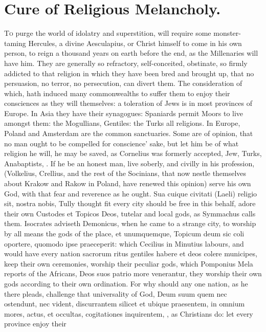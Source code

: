 {%
\section{Cure of Religious Melancholy.}

\lettrine{T}{o} purge the world of idolatry and superstition, will require some
monster-taming Hercules, a divine Aesculapius, or Christ himself to
come in his own person, to reign a thousand years on earth before the
end, as the Millenaries will have him. They are generally so
refractory, self-conceited, obstinate, so firmly addicted to that
religion in which they have been bred and brought up, that no
persuasion, no terror, no persecution, can divert them. The
consideration of which, hath induced many commonwealths to suffer them
to enjoy their consciences as they will themselves: a toleration of
Jews is in most provinces of Europe. In Asia they have their
synagogues: Spaniards permit Moors to live amongst them: the
Mogullians, Gentiles: the Turks all religions. In Europe, Poland and
Amsterdam are the common sanctuaries. Some are of opinion, that no man
ought to be compelled for conscience' sake, but let him be of what
religion he will, he may be saved, as Cornelius was formerly accepted,
Jew, Turks, Anabaptists, \etc{}. If he be an honest man, live soberly, and
civilly in his profession, (Volkelius, Crellius, and the rest of the
Socinians, that now nestle themselves about Krakow and Rakow in Poland,
have renewed this opinion) serve his own God, with that fear and
reverence as he ought. Sua cuique civitati (Laeli) religio sit, nostra
nobis, Tully thought fit every city should be free in this behalf,
adore their own Custodes et Topicos Deos, tutelar and local gods, as
Symmachus calls them. Isocrates adviseth Demonicus, when he came to a
strange city, to worship by all means the gods of the place, et
unumquemque, Topicum deum sic coli oportere, quomodo ipse praeceperit:
which Cecilius in Minutius labours, and would have every nation
sacrorum ritus gentiles habere et deos colere municipes, keep their own
ceremonies, worship their peculiar gods, which Pomponius Mela reports
of the Africans, Deos suos patrio more venerantur, they worship their
own gods according to their own ordination. For why should any one
nation, as he there pleads, challenge that universality of God, Deum
suum quem nec ostendunt, nec vident, discurrantem silicet et ubique
praesentem, in omnium mores, actus, et occultas, cogitationes
inquirentem, \etc{}, as Christians do: let every province enjoy their
}
